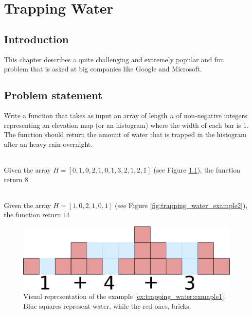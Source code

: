 %

\chapter{Trapping Water}
\label{ch:trapping_water}
\section*{Introduction}
This chapter describes a quite challenging and extremely popular and fun problem that is asked at big companies like Google and Microsoft. 


\section{Problem statement}
\begin{exercise}
Write a function that takes as input an array of length $n$ of non-negative integers representing an elevation map (or an histogram) where the width of each bar is $1$. The function should return the amount of water that is trapped in the histogram after an heavy rain overnight. 

	\begin{example}
		\label{ex:trapping_water:exmaple1}
		\hfill \\
		Given the array $H=[0,1,0,2,1,0,1,3,2,1,2,1]$ (see Figure \ref{fig:trapping_water_example1}), the function return $8$
	\end{example}

	\begin{example}
		\label{ex:trapping_water:exmaple2}
		\hfill \\
		Given the array $H=[1,0,2,1,0,1]$ (see Figure \ref{fig:trapping_water_example2}), the function return $14$
	\end{example}

\end{exercise}

\begin{figure}
		\label{fig:trapping_water_example1}
		\centering
		\includegraphics[scale=1.0]{sources/trapping_water/images/example1}
		\caption{Visual representation of the example \ref{ex:trapping_water:exmaple1}. Blue squares represent water, while the red ones, bricks.}
\end{figure}



